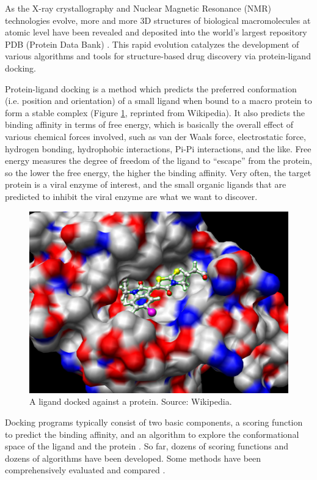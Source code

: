 As the X-ray crystallography and Nuclear Magnetic Resonance (NMR) technologies evolve, more and more 3D structures of biological macromolecules at atomic level have been revealed and deposited into the world's largest repository PDB (Protein Data Bank) \citep{540,537}. This rapid evolution catalyzes the development of various algorithms and tools for structure-based drug discovery via protein-ligand docking.

Protein-ligand docking is a method which predicts the preferred conformation (i.e. position and orientation) of a small ligand when bound to a macro protein to form a stable complex (Figure \ref{Background:Docking}, reprinted from Wikipedia). It also predicts the binding affinity in terms of free energy, which is basically the overall effect of various chemical forces involved, such as van der Waals force, electrostatic force, hydrogen bonding, hydrophobic interactions, Pi-Pi interactions, and the like. Free energy measures the degree of freedom of the ligand to ``escape'' from the protein, so the lower the free energy, the higher the binding affinity. Very often, the target protein is a viral enzyme of interest, and the small organic ligands that are predicted to inhibit the viral enzyme are what we want to discover.

\begin{figure}
\centering
\includegraphics[width=\textwidth]{Background/Docking.jpg}
\caption{A ligand docked against a protein. Source: Wikipedia.}
\label{Background:Docking}
\end{figure}

Docking programs typically consist of two basic components, a scoring function to predict the binding affinity, and an algorithm to explore the conformational space of the ligand and the protein \citep{493}. So far, dozens of scoring functions \citep{579,566,570,775,575,576,578,580,581,774} and dozens of algorithms \citep{595,564,594,602,603,604,605,606,607,781,614,615,617} have been developed. Some methods have been comprehensively evaluated and compared \citep{637,771,556}.

